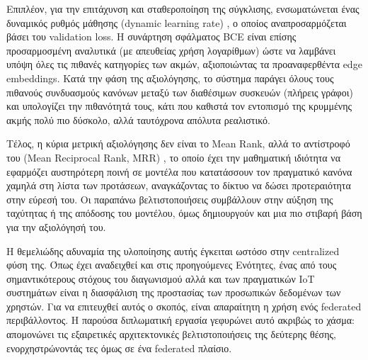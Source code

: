 Επιπλέον, για την επιτάχυνση και σταθεροποίηση της σύγκλισης, ενσωματώνεται ένας δυναμικός ρυθμός μάθησης (dynamic learning rate) \cite{ruder_overview_2016}, ο οποίος αναπροσαρμόζεται βάσει του validation loss. Η συνάρτηση σφάλματος BCE είναι επίσης προσαρμοσμένη αναλυτικά (με απευθείας χρήση λογαρίθμων) ώστε να λαμβάνει υπόψη όλες τις πιθανές κατηγορίες των ακμών, αξιοποιώντας τα προαναφερθέντα edge embeddings. Κατά την φάση της αξιολόγησης, το σύστημα παράγει όλους τους πιθανούς συνδυασμούς κανόνων μεταξύ των διαθέσιμων συσκευών (πλήρεις γράφοι) \cite{bordes_translating_2013} και υπολογίζει την πιθανότητά τους, κάτι που καθιστά τον εντοπισμό της κρυμμένης ακμής πολύ πιο δύσκολο, αλλά ταυτόχρονα απόλυτα ρεαλιστικό.

Τέλος, η κύρια μετρική αξιολόγησης δεν είναι το Mean Rank, αλλά το αντίστροφό του (Mean Reciprocal Rank, MRR) \cite{craswell_mean_2009}, το οποίο έχει την μαθηματική ιδιότητα να εφαρμόζει αυστηρότερη ποινή σε μοντέλα που κατατάσσουν τον πραγματικό κανόνα χαμηλά στη λίστα των προτάσεων, αναγκάζοντας το δίκτυο να δώσει προτεραιότητα στην εύρεσή του. Οι παραπάνω βελτιστοποιήσεις συμβάλλουν στην αύξηση της ταχύτητας ή της απόδοσης του μοντέλου, όμως δημιουργούν και μια πιο στιβαρή βάση για την αξιολόγησή του.

Η θεμελιώδης αδυναμία της υλοποίησης αυτής έγκειται ωστόσο στην centralized φύση της. Όπως έχει αναδειχθεί και στις προηγούμενες Ενότητες, ένας από τους σημαντικότερους στόχους του διαγωνισμού αλλά και των πραγματικών IoT συστημάτων είναι η διασφάλιση της προστασίας των προσωπικών δεδομένων των χρηστών. Για να επιτευχθεί αυτός ο σκοπός, είναι απαραίτητη η χρήση ενός federated περιβάλλοντος. Η παρούσα διπλωματική εργασία γεφυρώνει αυτό ακριβώς το χάσμα: απομονώνει τις εξαιρετικές αρχιτεκτονικές βελτιστοποιήσεις της δεύτερης θέσης, ενορχηστρώνοντάς τες όμως σε ένα federated πλαίσιο.